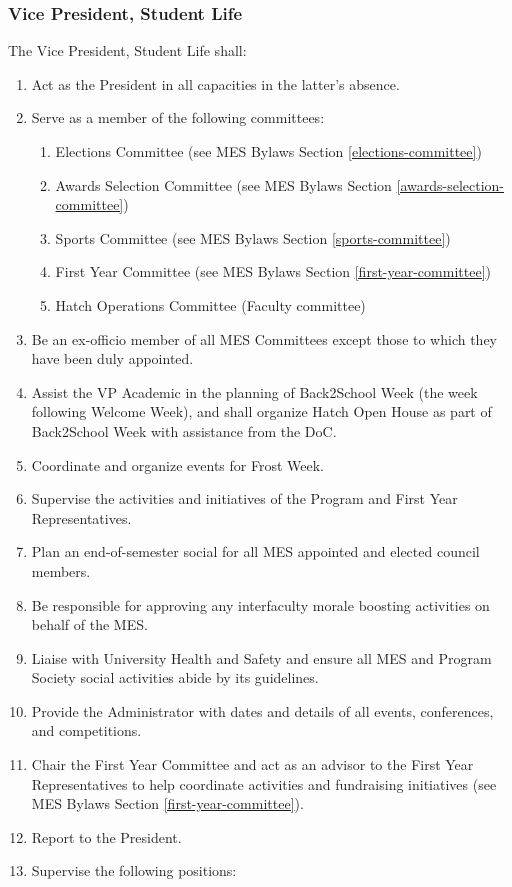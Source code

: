 \subsubsection{Vice President, Student
 Life}
\label{vice-president-student-life}
The Vice President, Student Life shall:

\begin{enumerate}
 \item
  Act as the President in all capacities in the latter's absence.
 \item
  Serve as a member of the following committees:

  \begin{enumerate}
   \item
    Elections Committee (see MES Bylaws Section \ref{elections-committee})
   \item
    Awards Selection Committee (see MES Bylaws Section \ref{awards-selection-committee})
   \item
    Sports Committee (see MES Bylaws Section \ref{sports-committee})
   \item
    First Year Committee (see MES Bylaws Section \ref{first-year-committee})
   \item
    Hatch Operations Committee (Faculty committee)
  \end{enumerate}
 \item
  Be an ex-officio member of all MES Committees except those to which they have been duly appointed.
 \item
  Assist the VP Academic in the planning of Back2School Week (the week following Welcome Week), and shall organize Hatch Open House as part of Back2School Week with assistance from the DoC.
 \item
  Coordinate and organize events for Frost Week.
 \item
  Supervise the activities and initiatives of the Program and First Year Representatives.
 \item
  Plan an end-of-semester social for all MES appointed and elected council members.
 \item
  Be responsible for approving any interfaculty morale boosting activities on behalf of the MES.
 \item
  Liaise with University Health and Safety and ensure all MES and Program Society social activities abide by its guidelines.
 \item
  Provide the Administrator with dates and details of all events, conferences, and competitions.
 \item
  Chair the First Year Committee and act as an advisor to the First Year Representatives to help coordinate activities and fundraising initiatives (see MES Bylaws Section \ref{first-year-committee}).
 \item
  Report to the President.
 \item
  Supervise the following positions:


\end{enumerate}
